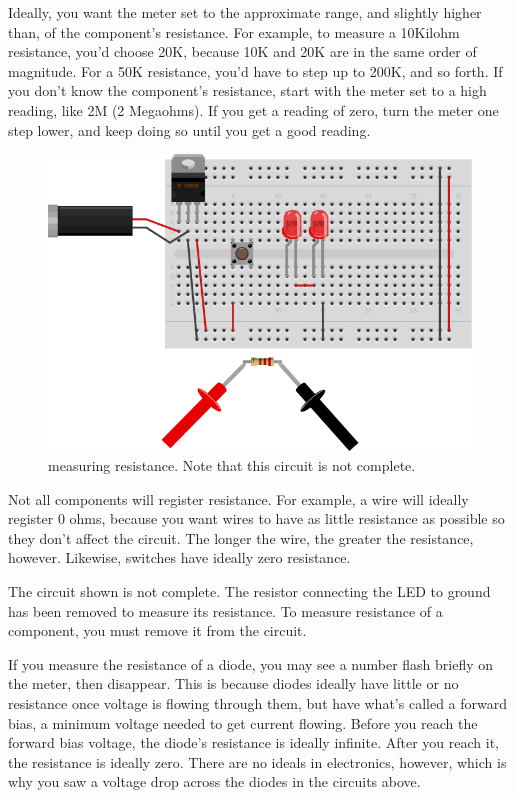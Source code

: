 Ideally, you want the meter set to the approximate range, and slightly higher than, of the component's resistance. For example, to measure a 10Kilohm resistance, you'd choose 20K, because 10K and 20K are in the same order of magnitude. For a 50K resistance, you'd have to step up to 200K, and so forth. If you don't know the component's resistance, start with the meter set to a high reading, like 2M (2 Megaohms). If you get a reading of zero, turn the meter one step lower, and keep doing so until you get a good reading.

\begin{figure}[!htb]
 \centering
 \includegraphics[scale=0.8]{img/electronics/measuring_resistance.jpg}
 \caption{measuring resistance. Note that this circuit is not complete.}
 \label{measuring resistance. Note that this circuit is not complete.}
\end{figure}

Not all components will register resistance. For example, a wire will ideally register 0 ohms, because you want wires to have as little resistance as possible so they don't affect the circuit. The longer the wire, the greater the resistance, however. Likewise, switches have ideally zero resistance.

The circuit shown is not complete. The resistor connecting the LED to ground has been removed to measure its resistance. To measure resistance of a component, you must remove it from the circuit.

If you measure the resistance of a diode, you may see a number flash briefly on the meter, then disappear. This is because diodes ideally have little or no resistance once voltage is flowing through them, but have what's called a forward bias, a minimum voltage needed to get current flowing. Before you reach the forward bias voltage, the diode's resistance is ideally infinite. After you reach it, the resistance is ideally zero. There are no ideals in electronics, however, which is why you saw a voltage drop across the diodes in the circuits above.

